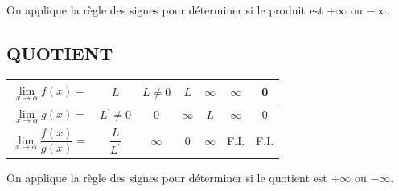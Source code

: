 On applique la règle des signes pour déterminer si le produit est $+\infty$ ou $-\infty$.

\subsection*{QUOTIENT}

\begin{center}
	\begin{tabular}{|c|c|c|c|c|c|c|}
		\hline
		$\lim \limits_{x \rightarrow \alpha} f(x)=$ & $L$ & $L \neq 0$ & $L$ & $\infty$ & $\infty$ & 0 \\
		\hline
		$\lim \limits_{x \rightarrow \alpha} g(x)=$ & $L^{\prime} \neq 0$ & 0 & $\infty$ & $L$ & $\infty$ & 0 \\
		\hline
		$\lim \limits_{x \rightarrow \alpha} \dfrac{f(x)}{g(x)}=$ & $\dfrac{L}{L^{\prime}}$ & $\infty$ & 0 & $\infty$ & F.I. & F.I. \\
		\hline
	\end{tabular}
\end{center}

On applique la règle des signes pour déterminer si le quotient est $+\infty$ ou $-\infty$.

